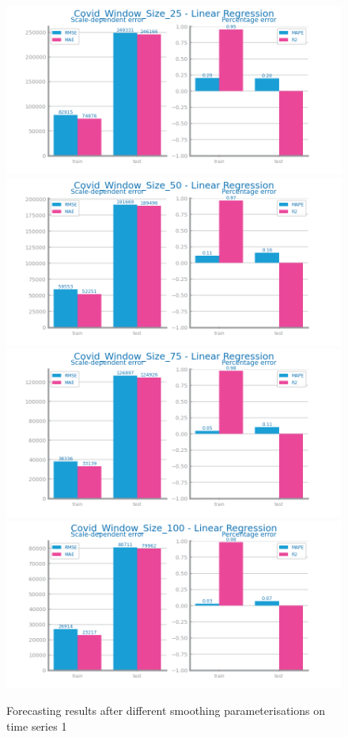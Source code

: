 \documentclass[10pt]{extarticle}
\begin{document}
\begin{figure}[H]
\centering\includegraphics[scale=0.5]{images/dataset1/time_series/Covid_Window_Size_25 - Linear Regression_forecasting_eval.png}
\includegraphics[scale=0.5]{images/dataset1/time_series/Covid_Window_Size_50 - Linear Regression_forecasting_eval.png}
\includegraphics[scale=0.5]{images/dataset1/time_series/Covid_Window_Size_75 - Linear Regression_forecasting_eval.png}
\includegraphics[scale=0.5]{images/dataset1/time_series/Covid_Window_Size_100 - Linear Regression_forecasting_eval.png}
\caption{Forecasting results after different smoothing parameterisations on time series 1}
\end{figure}
\end{document}
